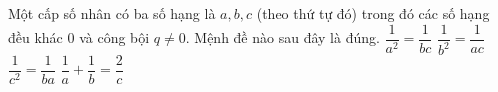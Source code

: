 \begin{ex}%
	Một cấp số nhân có ba số hạng là $a,b,c$ (theo thứ tự đó) trong đó các số hạng đều khác $0$ và công bội $q\ne 0$. Mệnh đề nào sau đây là đúng.
	\choice
	{$\dfrac{1}{a^2}=\dfrac{1}{bc}$}
	{\True $\dfrac{1}{b^2}=\dfrac{1}{ac}$}
	{$\dfrac{1}{c^2}=\dfrac{1}{ba}$}
	{$\dfrac{1}{a}+\dfrac{1}{b}=\dfrac{2}{c}$}
\end{ex}

